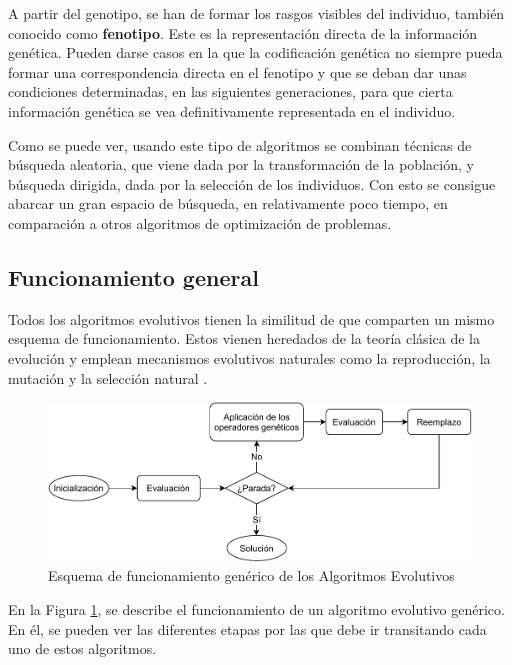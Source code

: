 A partir del genotipo, se han de formar los rasgos visibles del individuo, también conocido como \textbf{fenotipo}. Este es la representación directa de la información genética. Pueden darse casos en la que la codificación genética no siempre pueda formar una correspondencia directa en el fenotipo y que se deban dar unas condiciones determinadas, en las siguientes generaciones, para que cierta información genética se vea definitivamente representada en el individuo.

Como se puede ver, usando este tipo de algoritmos se combinan técnicas de búsqueda aleatoria, que viene dada por la transformación de la población, y búsqueda dirigida, dada por la selección de los individuos. Con esto se consigue abarcar un gran espacio de búsqueda, en relativamente poco tiempo, en comparación a otros algoritmos de optimización de problemas.

\subsection{Funcionamiento general}

Todos los algoritmos evolutivos tienen la similitud de que comparten un mismo esquema de funcionamiento. Estos vienen heredados de la teoría clásica de la evolución y emplean mecanismos evolutivos naturales como la reproducción, la mutación y la selección natural \cite{10.5555/2432058}.

\begin{figure}[h]
    \centering
    \includegraphics[width=\textwidth]{figuras/desarrollo teorico/Algoritmo_Evolutivo.pdf}
    \caption{Esquema de funcionamiento genérico de los Algoritmos Evolutivos}
    \label{fig:diagrama_alg_evolutivo}
\end{figure}

En la Figura \ref{fig:diagrama_alg_evolutivo}, se describe el funcionamiento de un algoritmo evolutivo genérico. En él, se pueden ver las diferentes etapas por las que debe ir transitando cada uno de estos algoritmos.

